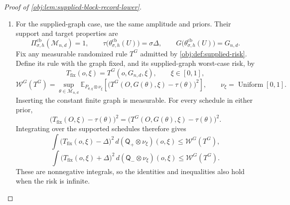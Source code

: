 \documentclass[11pt]{article}
\begin{document}
\begin{proof}[Proof of \cref{obj:lem:supplied-block-record-lower}]
\begin{enumerate}
\item For the supplied-graph case, use the same amplitude and priors. Their support and target properties are
\[
\Pi^{\mathrm{cb}}_{\sigma,h}(\mathcal M_{n,d})=1,
\qquad
\tau\bigl(\theta^{\mathrm{cb}}_{\sigma,h}(U)\bigr)=\sigma\Delta,
\qquad
G\bigl(\theta^{\mathrm{cb}}_{\sigma,h}(U)\bigr)=G_{n,d}.
\]
Fix any measurable randomized rule \(T^G\) admitted by
\cref{obj:def:supplied-risk}. Define its rule with the graph fixed, and its supplied-graph worst-case risk, by
\[
T_{\mathrm{fix}}(o,\xi)=T^G(o,G_{n,d},\xi),
\qquad \xi\in[0,1],
\]
\[
\mathcal W^G(T^G)
=
\sup_{\theta\in\mathcal M_{n,d}}
\mathbb E_{P_{\theta,q}\otimes\nu_\xi}
\left[
\bigl(T^G(O,G(\theta),\xi)-\tau(\theta)\bigr)^2
\right],
\qquad
\nu_\xi=\operatorname{Uniform}[0,1].
\]
Inserting the constant finite graph is measurable. For every schedule in either prior,
\[
\bigl(T_{\mathrm{fix}}(O,\xi)-\tau(\theta)\bigr)^2
=
\bigl(T^G(O,G(\theta),\xi)-\tau(\theta)\bigr)^2.
\]
Integrating over the supported schedules therefore gives
\[
\int
\bigl(T_{\mathrm{fix}}(o,\xi)-\Delta\bigr)^2
\,d(\mathsf Q_+\otimes\nu_\xi)(o,\xi)
\le\mathcal W^G(T^G),
\]
\[
\int
\bigl(T_{\mathrm{fix}}(o,\xi)+\Delta\bigr)^2
\,d(\mathsf Q_-\otimes\nu_\xi)(o,\xi)
\le\mathcal W^G(T^G).
\]
These are nonnegative integrals, so the identities and inequalities also hold when the risk is infinite.


\end{enumerate}
\end{proof}
\end{document}
